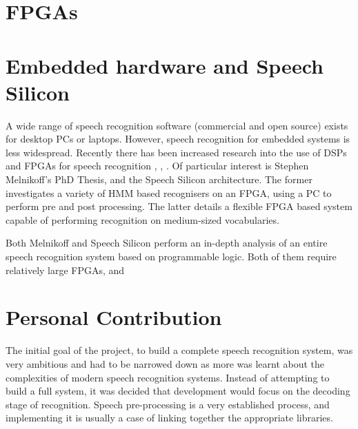 \section{FPGAs} %
\label{sec:fpgas}


\section{Embedded hardware and Speech Silicon} %
\label{sec:embedded_hardware}
	A wide range of speech recognition software (commercial and open source) exists for desktop PCs or laptops.  However, speech recognition for embedded systems is less widespread.  Recently there has been increased research into the use of DSPs and FPGAs for speech recognition \cite{melnikoff2003speech}, \cite{schuster2006speech}, \cite{nedevschi2005hardware}.  Of particular interest is Stephen Melnikoff's PhD Thesis, and the Speech Silicon architecture.  The former investigates a variety of HMM based recognisers on an FPGA, using a PC to perform pre and post processing.  The latter details a flexible FPGA based system capable of performing recognition on medium-sized vocabularies.

	Both Melnikoff and Speech Silicon perform an in-depth analysis of an entire speech recognition system based on programmable logic.  Both of them require relatively large FPGAs, and 



\section{Personal Contribution} %
\label{sec:personal_contribution}
	The initial goal of the project, to build a complete speech recognition system, was very ambitious and had to be narrowed down as more was learnt about the complexities of modern speech recognition systems.  Instead of attempting to build a full system, it was decided that development would focus on the decoding stage of recognition.  Speech pre-processing is a very established process, and implementing it is usually a case of linking together the appropriate libraries.


